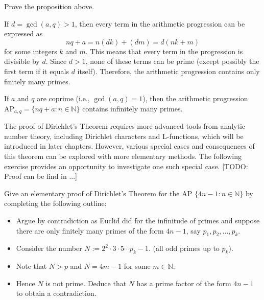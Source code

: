 \documentclass{elegantbook}
\begin{document}
\begin{exercise}
  Prove the proposition above.
\end{exercise}

\begin{solution}
  If $d = \gcd(a, q) > 1$, then every term in the arithmetic progression can be expressed as
  \[
    nq + a = n(dk) + (dm) = d(nk + m)
  \]
  for some integers $k$ and $m$. This means that every term in the progression is divisible by $d$. Since $d > 1$, none of these terms can be prime (except possibly the first term if it equals $d$ itself). Therefore, the arithmetic progression contains only finitely many primes.
\end{solution}


\begin{theorem} \label{thm:PN_in_AP}
  If $a$ and $q$ are coprime (i.e., $\gcd(a, q) = 1$), then the arithmetic progression $\mathrm{AP}_{a,q} = \{nq + a : n \in \mathbb{N}\}$ contains infinitely many primes.
\end{theorem}

The proof of Dirichlet's Theorem requires more advanced tools from analytic number theory, including Dirichlet characters and L-functions, which will be introduced in later chapters. However, various special cases and consequences of this theorem can be explored with more elementary methods. The following exercise provides an opportunity to investigate one such special case. [TODO: Proof can be find in ...]

\begin{exercise}
  Give an elementary proof of Dirichlet's Theorem for the AP $\{ 4n-1: n \in \mathbb{N} \}$ by completing the following outline:
  \begin{itemize}
    \item Argue by contradiction as Euclid did for the infinitude of primes and suppose there are only finitely many primes of the form $4n-1$, say $p_1, p_2, \ldots, p_k$.
    \item Consider the number $N := 2^2 \cdot 3 \cdot 5 \cdots p_k - 1$. (all odd primes up to $p_k$).
    \item Note that $N > p$ and $N = 4m-1$ for some $m \in \mathbb{N}$.
    \item Hence $N$ is not prime. Deduce that $N$ has a prime factor of the form $4n-1$ to obtain a contradiction.
  \end{itemize}
\end{exercise}
\end{document}
